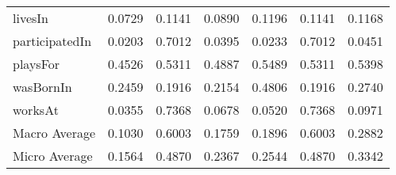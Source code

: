 \begin{table}[htbp]
\begin{center}
\begin{tabular}{|l||c|c|c||c|c|c|}
 livesIn & 0.0729 & 0.1141 & 0.0890 & 0.1196 & 0.1141 & 0.1168 \\
 participatedIn & 0.0203 & 0.7012 & 0.0395 & 0.0233 & 0.7012 & 0.0451 \\
 playsFor & 0.4526 & 0.5311 & 0.4887 & 0.5489 & 0.5311 & 0.5398 \\
 wasBornIn & 0.2459 & 0.1916 & 0.2154 & 0.4806 & 0.1916 & 0.2740 \\
 worksAt & 0.0355 & 0.7368 & 0.0678 & 0.0520 & 0.7368 & 0.0971 \\
    \hline
 Macro Average & 0.1030 & 0.6003 & 0.1759 & 0.1896 & 0.6003 & 0.2882 \\
 Micro Average & 0.1564 & 0.4870 & 0.2367 & 0.2544 & 0.4870 & 0.3342 \\
    \hline
 \end{tabular}
 \end{center}
 \end{table}


